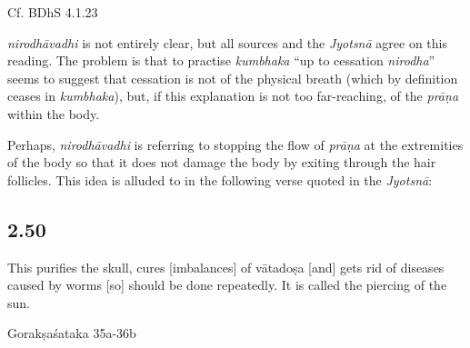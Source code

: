 \begin{ekdosis}
\begin{philcomm}[hp02_049]
Cf. BDhS 4.1.23
\begin{versinnote}
\end{versinnote}

\emph{nirodhāvadhi} is not entirely clear, but all sources and the \emph{Jyotsnā} agree on this reading. The problem is that to practise \emph{kumbhaka} ``up to cessation \emph{nirodha}'' seems to suggest that cessation is not of the physical breath (which by definition ceases in \emph{kumbhaka}), but, if this explanation is not too far-reaching, of the \emph{prāṇa} within the body.

Perhaps, \emph{nirodhāvadhi} is referring to stopping the flow of \emph{prāṇa} at the extremities of the body so that it does not damage the body by exiting through the hair follicles. This idea is alluded to in the following verse quoted in the \emph{Jyotsnā}:

\begin{versinnote}
\end{versinnote}
\end{philcomm}


\subsection*{2.50}
\begin{translation}[hp02_050]
This purifies the skull, cures [imbalances] of vātadoṣa [and] gets rid of diseases caused by worms [so] should be done repeatedly. It is called the piercing of the sun.
\end{translation}

\begin{sources}[hp02_050]
Gorakṣaśataka 35a-36b

\begin{versinnote}
\end{versinnote}
\end{sources}


\end{ekdosis}

